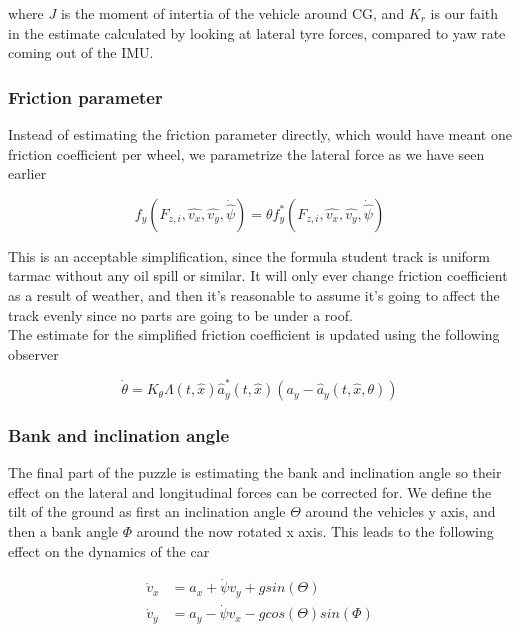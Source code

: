 where $J$ is the moment of intertia of the vehicle around CG, and $K_r$ is our faith in the estimate calculated by looking at lateral tyre forces, compared to yaw rate coming out of the IMU. 

\subsubsection{Friction parameter}
Instead of estimating the friction parameter directly, which would have meant one friction coefficient per wheel, we parametrize the lateral force as we have seen earlier

\begin{equation}
    f_y(F_{z,i}, \hat{v_x}, \hat{v_y}, \dot{\hat{\psi}}) =\theta f_y^*(F_{z,i}, \hat{v_x}, \hat{v_y}, \dot{\hat{\psi}}) 
\end{equation}

This is an acceptable simplification, since the formula student track is uniform tarmac without any oil spill or similar. It will only ever change friction coefficient as a result of weather, and then it's reasonable to assume it's going to affect the track evenly since no parts are going to be under a roof. \\ 

The estimate for the simplified friction coefficient is updated using the following observer

\begin{equation}
    \dot{\theta} = K_{\theta}\Lambda (t, \hat{x})\hat{a}_y^*(t,\hat{x})(a_y - \hat{a}_y(t,\hat{x},\theta))
\end{equation}

\subsubsection{Bank and inclination angle}

The final part of the puzzle is estimating the bank and inclination angle so their effect on the lateral and longitudinal forces can be corrected for. We define the tilt of the ground as first an inclination angle $\Theta$ around the vehicles y axis, and then a bank angle $\Phi$ around the now rotated x axis. This leads to the following effect on the dynamics of the car

\begin{align}
    \dot{v}_x & = a_x + \dot{\psi} v_y + g sin(\Theta) \\
    \dot{v}_y & = a_y - \dot{\psi}v_x - g cos(\Theta) sin(\Phi)
\end{align}

